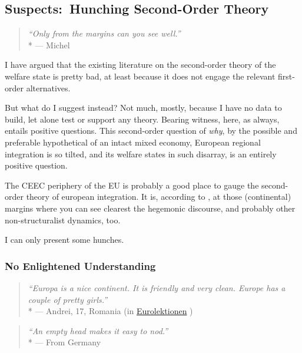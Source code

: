 \subsection[Suspects]{Suspects:\ Hunching Second-Order Theory}

\begin{quote}
	\emph{``Only from the margins can you see well.''}
	\\*
	--- Michel \cite{Foucault-1972-aa}
\end{quote}

I have argued that the existing literature on the second-order theory of the welfare state is pretty bad, at least because it does not engage the relevant first-order alternatives.

But what do I suggest instead?
Not much, mostly, because I have no data to build, let alone test or support any theory.
Bearing witness, here, as always, entails positive questions.
This second-order question of \emph{why}, by the possible and preferable hypothetical of an intact mixed economy, European regional integration is so tilted, and its welfare states in such disarray, is an entirely positive question.

The \gls{CEEC} periphery of the \gls{EU} is probably a good place to gauge the second-order theory of european integration.
It is, according to \cite{Foucault-1972-aa}, at those (continental) margins where you can see clearest the hegemonic discourse, and probably other non-structuralist dynamics, too.

I can only present some hunches.

\subsubsection[No Enlightened Understanding]{No Enlightened Understanding}

\begin{quote}
	\emph{``Europa is a nice continent.
	It is friendly and very clean.
	Europe has a couple of pretty girls.''}
	\\*
	--- Andrei, 17, Romania (in \href{http://eurolektionen.de}{Eurolektionen} \citeyear{DeRuffray2010})
\end{quote}

\begin{quote}
	\emph{``An empty head makes it easy to nod.''}
	\\*
	--- From Germany
\end{quote}

